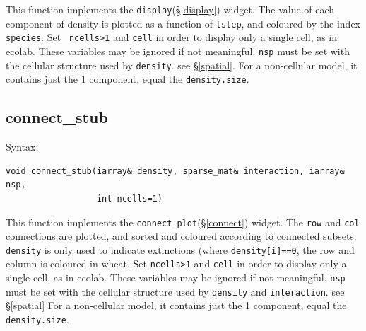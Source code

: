 This function implements the {\tt display}(\S\ref{display}) widget.
The value of each component of density is plotted as a function of
{\tt tstep}, and coloured by the index {\tt species}. Set {\tt
  ncells>1} and {\tt cell} in order to display only a single cell, as
in ecolab. These variables may be ignored if not meaningful. {\tt nsp}
must be set with the cellular structure used by {\tt density}. see
\S\ref{spatial}. For a non-cellular model, it contains just the 1
component, equal the {\tt density.size}.

\subsection{connect\_stub}

Syntax:

\begin{verbatim}
void connect_stub(iarray& density, sparse_mat& interaction, iarray& nsp, 
                  int ncells=1)
\end{verbatim}

This function implements the {\tt connect\_plot}(\S\ref{connect})
widget. The {\tt row} and {\tt col} connections are plotted, and
sorted and coloured according to connected subsets. {\tt density} is
only used to indicate extinctions (where {\tt density[i]==0}, the row
and column is coloured in wheat. Set {\tt ncells>1} and {\tt cell} in
order to display only a single cell, as in ecolab. These variables may
be ignored if not meaningful. {\tt nsp} must be set with the cellular
structure used by {\tt density} and {\tt interaction}. see
\S\ref{spatial} For a non-cellular model, it contains just the 1
component, equal the {\tt density.size}.

